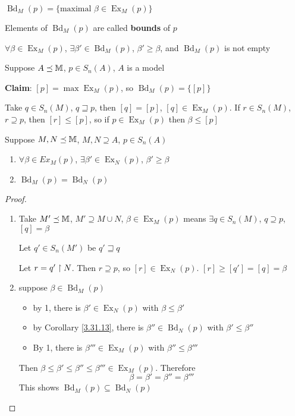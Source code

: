 \documentclass[11pt]{article}
\DeclareMathOperator{\Ex}{Ex}
\DeclareMathOperator{\Bd}{Bd}
\begin{document}
\begin{definition}[]
\(\Bd_M(p)=\{\text{maximal }\beta\in\Ex_M(p)\}\)

Elements of \(\Bd_M(p)\) are called \textbf{bounds} of \(p\)
\end{definition}

\begin{corollary}[]
\label{3.31.13}
\(\forall\beta\in\Ex_M(p)\), \(\exists\beta'\in\Bd_M(p)\), \(\beta'\ge\beta\), and \(\Bd_M(p)\) is not empty
\end{corollary}

\begin{examplle}[]
Suppose \(A\preceq\mathbb{M}\), \(p\in S_n(A)\), \(A\) is a model

\textbf{Claim}: \([p]=\max\Ex_M(p)\), so \(\Bd_M(p)=\{[p]\}\)

Take \(q\in S_n(M)\), \(q\sqsupseteq p\), then \([q]=[p]\), \([q]\in\Ex_M(p)\).
If \(r\in S_n(M)\), \(r\supseteq p\), then \([r]\le[p]\), so if \(p\in\Ex_M(p)\) then \(\beta\le[p]\)
\end{examplle}

\begin{lemma}[]
\label{3.31.15}
Suppose \(M,N\preceq\mathbb{M}\), \(M,N\supseteq A\), \(p\in S_n(A)\)
\begin{enumerate}
\item \(\forall\beta\in Ex_M(p)\), \(\exists\beta'\in\Ex_N(p)\), \(\beta'\ge\beta\)
\item \(\Bd_M(p)=\Bd_N(p)\)
\end{enumerate}
\end{lemma}

\begin{proof}
\begin{enumerate}
\item Take \(M'\preceq\mathbb{M}\), \(M'\supseteq M\cup N\), \(\beta\in\Ex_M(p)\) means \(\exists q\in S_n(M)\), \(q\supseteq p\), \([q]=\beta\)

Let \(q'\in S_n(M')\) be \(q'\sqsupseteq q\)

Let \(r=q'\upharpoonright N\). Then \(r\supseteq p\), so \([r]\in\Ex_N(p)\). \([r]\ge[q']=[q]=\beta\)
\item suppose \(\beta\in\Bd_M(p)\)
\begin{itemize}
\item by 1, there is \(\beta'\in\Ex_N(p)\) with \(\beta\le\beta'\)
\item by Corollary \ref{3.31.13}, there is \(\beta''\in\Bd_N(p)\) with \(\beta'\le\beta''\)
\item By 1, there is \(\beta'''\in\Ex_M(p)\) with \(\beta''\le\beta'''\)
\end{itemize}
Then \(\beta\le\beta'\le\beta''\le\beta'''\in\Ex_M(p)\). Therefore
\begin{equation*}
\beta=\beta'=\beta''=\beta'''
\end{equation*}
This shows \(\Bd_M(p)\subseteq\Bd_N(p)\)
\end{enumerate}
\end{proof}
\end{document}
